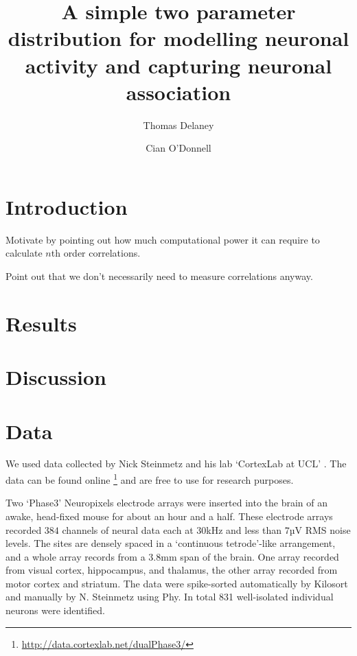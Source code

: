 \documentclass[a4paper,12pt]{article}
\title{A simple two parameter distribution for modelling neuronal activity and capturing neuronal association}
\date{}
\author[1]{Thomas Delaney}
\author[1]{Cian O'Donnell}
\affil[1]{School of Computer Science, Electrical and Electronic Engineering, and Engineering Mathematics, University of Bristol, Bristol, United Kingdom.}
\theoremstyle{definition}
\begin{document}
\maketitle



\section{Introduction}
  Motivate by pointing out how much computational power it can require to calculate $n$th order correlations.

  Point out that we don't necessarily need to measure correlations anyway.

\section{Results}

\section{Discussion}

\section{Data}
We used data collected by Nick Steinmetz and his lab `CortexLab at UCL' \cite{steinmetz}. The data can be found online \footnote{\url{http://data.cortexlab.net/dualPhase3/}} and are free to use for research purposes.

Two `Phase3' Neuropixels \cite{jun} electrode arrays were inserted into the brain of an awake, head-fixed mouse for about an hour and a half. These electrode arrays recorded $384$ channels of neural data each at $30$kHz and  less than $7$µV RMS noise levels. The sites are densely spaced in a `continuous tetrode'-like arrangement, and a whole array records from a $3.8$mm span of the brain. One array recorded from visual cortex, hippocampus,  and thalamus, the other array recorded from motor cortex and striatum. The data were spike-sorted automatically by Kilosort and manually by N. Steinmetz using Phy. In total 831 well-isolated individual neurons were identified.
\end{document}
